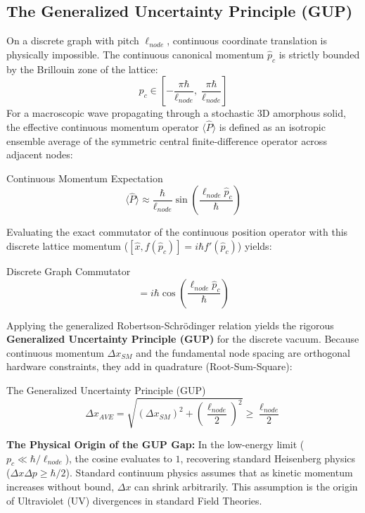 \subsection{The Generalized Uncertainty Principle (GUP)}
On a discrete graph with pitch $\ell_{node}$, continuous coordinate translation is physically impossible. The continuous canonical momentum $\hat{p}_c$ is strictly bounded by the Brillouin zone of the lattice:
\begin{equation}
    p_c \in \left[-\frac{\pi\hbar}{\ell_{node}},\; \frac{\pi\hbar}{\ell_{node}}\right]
\end{equation}
For a macroscopic wave propagating through a stochastic 3D amorphous solid, the effective continuous momentum operator $\langle \hat{P} \rangle$ is defined as an isotropic ensemble average of the symmetric central finite-difference operator across adjacent nodes:
\begin{resultbox}{Continuous Momentum Expectation}
\begin{equation}
    \langle \hat{P} \rangle \approx \frac{\hbar}{\ell_{node}} \sin\left(\frac{\ell_{node} \hat{p}_c}{\hbar}\right)
\end{equation}
\end{resultbox}

Evaluating the exact commutator of the continuous position operator with this discrete lattice momentum ($[\hat{x}, f(\hat{p}_c)] = i\hbar f'(\hat{p}_c)$) yields:
\begin{resultbox}{Discrete Graph Commutator}
\begin{equation}
    [\hat{x}, \langle \hat{P} \rangle] = i\hbar \cos\left(\frac{\ell_{node} \hat{p}_c}{\hbar}\right)
\end{equation}
\end{resultbox}

Applying the generalized Robertson-Schr\"odinger relation yields the rigorous \textbf{Generalized Uncertainty Principle (GUP)} for the discrete vacuum. Because continuous momentum $\Delta x_{SM}$ and the fundamental node spacing are orthogonal hardware constraints, they add in quadrature (Root-Sum-Square):
\begin{resultbox}{The Generalized Uncertainty Principle (GUP)}
\begin{equation}
    \Delta x_{AVE} = \sqrt{(\Delta x_{SM})^2 + \left(\frac{\ell_{node}}{2}\right)^2} \ge \frac{\ell_{node}}{2}
\end{equation}
\end{resultbox}

\textbf{The Physical Origin of the GUP Gap:} In the low-energy limit ($p_c \ll \hbar/\ell_{node}$), the cosine evaluates to $1$, recovering standard Heisenberg physics ($\Delta x \Delta p \ge \hbar/2$). Standard continuum physics assumes that as kinetic momentum increases without bound, $\Delta x$ can shrink arbitrarily. This assumption is the origin of Ultraviolet (UV) divergences in standard Field Theories.

